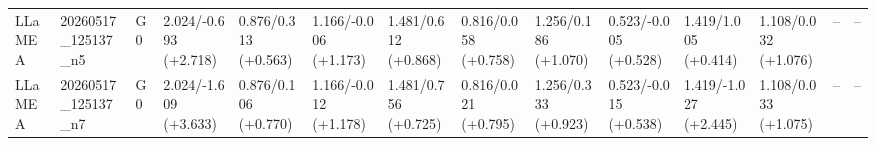 \begin{table}[htbp]
\begin{adjustbox}{width=\textwidth,center}
\begin{tabular}{llllllllllllll}
LLaMEA & 20260517\_125137\_n5 & G0 & 2.024/-0.693 (+2.718) & 0.876/0.313 (+0.563) & 1.166/-0.006 (+1.173) & 1.481/0.612 (+0.868) & 0.816/0.058 (+0.758) & 1.256/0.186 (+1.070) & 0.523/-0.005 (+0.528) & 1.419/1.005 (+0.414) & 1.108/0.032 (+1.076) & -- & -- \\
LLaMEA & 20260517\_125137\_n7 & G0 & 2.024/-1.609 (+3.633) & 0.876/0.106 (+0.770) & 1.166/-0.012 (+1.178) & 1.481/0.756 (+0.725) & 0.816/0.021 (+0.795) & 1.256/0.333 (+0.923) & 0.523/-0.015 (+0.538) & 1.419/-1.027 (+2.445) & 1.108/0.033 (+1.075) & -- & -- \\
\bottomrule
\end{tabular}
\end{adjustbox}
\end{table}